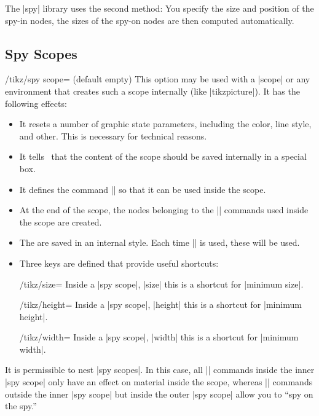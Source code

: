 The |spy| library uses the second method: You specify the size and
position of the spy-in nodes, the sizes of the spy-on nodes are then
computed automatically.



\subsection{Spy Scopes}

\begin{key}{/tikz/spy scope= (default \normalfont empty)}
  This option may be used with a |{scope}| or any environment that
  creates such a scope internally (like |{tikzpicture}|). It has the
  following effects:
  \begin{itemize}
  \item It resets a number of graphic state parameters, including the
    color, line style, and other. This is necessary for technical
    reasons. 
  \item It tells \tikzname\ that the content of the scope should be saved
    internally in a special box.
  \item It defines the command |\spy| so that it can be used inside
    the scope.
  \item At the end of the scope, the nodes belonging to the |\spy|
    commands used inside the scope are created.
  \item The  are saved in an internal style. Each time
    |\spy| is used, these  will be used.
  \item Three keys are defined that provide useful shortcuts:
    \begin{key}{/tikz/size=}
      Inside a |spy scope|, |size| this is a shortcut for |minimum size|.      
    \end{key}
    \begin{key}{/tikz/height=}
      Inside a |spy scope|, |height| this is a shortcut for |minimum height|.      
    \end{key}
    \begin{key}{/tikz/width=}
      Inside a |spy scope|, |width| this is a shortcut for |minimum width|.      
    \end{key}
  \end{itemize}
  It is permissible to nest |spy scopes|. In this case, all |\spy|
  commands inside the inner |spy scope| only have an effect on
  material inside the scope, whereas |\spy| commands outside the inner
  |spy scope| but inside the outer |spy scope| allow you to ``spy on
  the spy.''
  

\end{key}
